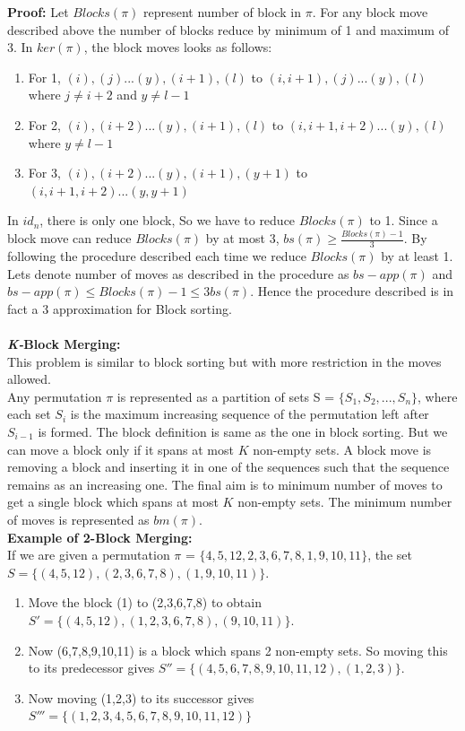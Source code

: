 \documentclass[BTech]{iitmdiss}
\begin{document}
\textbf{Proof:}
Let $Blocks(\pi)$ represent number of block in $\pi$. For any block move described above the number of blocks reduce by minimum of 1 and maximum of 3. In $ker(\pi)$, the block moves looks as follows:
\begin{enumerate}
    \item For 1, $(i),(j)...(y),(i+1),(l)$ to $(i,i+1),(j)...(y),(l)$ where $j \neq i+2$ and $y \neq l-1$
    \item For 2, $(i),(i+2)...(y),(i+1),(l)$ to $(i,i+1,i+2)...(y),(l)$ where $y \neq l-1$
    \item For 3, $(i),(i+2)...(y),(i+1),(y+1)$ to $(i,i+1,i+2)...(y,y+1)$
\end{enumerate}
In $id_n$, there is only one block, So we have to reduce $Blocks(\pi)$ to 1. Since a block move can reduce $Blocks(\pi)$ by at most 3, $bs(\pi) \geq \frac{Blocks(\pi) - 1}{3}$. By following the procedure described each time we reduce $Blocks(\pi)$ by at least 1. Lets denote number of moves as described in the procedure as $bs-app(\pi)$ and $bs-app(\pi) \leq Blocks(\pi)-1 \leq 3bs(\pi)$. Hence the procedure described is in fact a 3 approximation for Block sorting.\\~\\
\noindent
\textbf{\textit{K-}Block Merging:}\\
This problem is similar to block sorting but with more restriction in the moves allowed.\\
Any permutation $\pi$ is represented as a partition of sets S = $\{S_1,S_2,...,S_n\}$, where each set $S_i$ is the maximum increasing sequence of the permutation left after $S_{i-1}$ is formed. The block definition is same as the one in block sorting. But we can move a block only if it spans at most $K$ non-empty sets. A block move is removing a block and inserting it in one of the sequences such that the sequence remains as an increasing one.  The final aim is to minimum number of moves to get a single block which spans at most $K$ non-empty sets. The minimum number of moves is represented as $bm(\pi)$.\\
\textbf{Example of 2-Block Merging:}\\
If we are given a permutation $\pi$ = $\{4,5,12,2,3,6,7,8,1,9,10,11\}$, the set $S = \{(4,5,12),(2,3,6,7,8),(1,9,10,11)\}.$
\begin{enumerate}
    \item Move the block (1) to (2,3,6,7,8) to obtain $S' = \{(4,5,12),(1,2,3,6,7,8),(9,10,11)\}.$ 
    \item Now (6,7,8,9,10,11) is a block which spans 2 non-empty sets. So moving this to its predecessor gives $S'' = \{(4,5,6,7,8,9,10,11,12),(1,2,3)\}.$ 
    \item Now moving (1,2,3) to its successor gives $S''' = \{(1,2,3,4,5,6,7,8,9,10,11,12)\}$
\end{enumerate}
\end{document}
